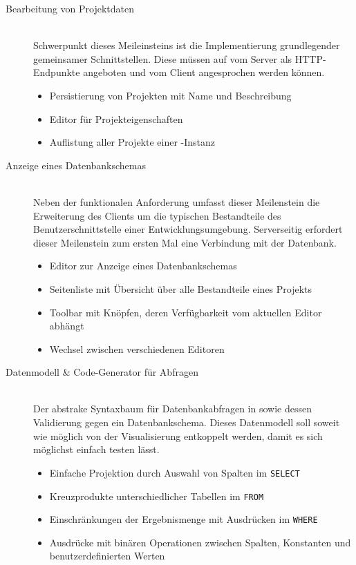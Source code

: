 \begin{description}
\item[Bearbeitung von Projektdaten] \hfill \\
  Schwerpunkt dieses Meileinsteins ist die Implementierung grundlegender gemeinsamer Schnittstellen. Diese müssen auf vom Server als HTTP-Endpunkte angeboten und vom Client angesprochen werden können.
  \begin{itemize}[noitemsep]
  \item Persistierung von Projekten mit Name und Beschreibung
  \item Editor für Projekteigenschaften
  \item Auflistung aller Projekte einer \idename-Instanz
  \end{itemize}
\item [Anzeige eines Datenbankschemas] \hfill \\
  Neben der funktionalen Anforderung umfasst dieser Meilenstein die Erweiterung des Clients um die typischen Bestandteile des Benutzerschnittstelle einer Entwicklungsumgebung. Serverseitig erfordert dieser Meilenstein zum ersten Mal eine Verbindung mit der Datenbank.
  \begin{itemize}[noitemsep]
  \item Editor zur Anzeige eines Datenbankschemas
  \item Seitenliste mit Übersicht über alle Bestandteile eines Projekts
  \item Toolbar mit Knöpfen, deren Verfügbarkeit vom aktuellen Editor abhängt
  \item Wechsel zwischen verschiedenen Editoren
  \end{itemize}
\item [Datenmodell \& Code-Generator für Abfragen] \hfill \\
  Der abstrake Syntaxbaum für Datenbankabfragen in \idename{} sowie dessen Validierung gegen ein Datenbankschema. Dieses Datenmodell soll soweit wie möglich von der Visualisierung entkoppelt werden, damit es sich möglichst einfach testen lässt.
  \begin{itemize}[noitemsep]
  \item Einfache Projektion durch Auswahl von Spalten im \texttt{SELECT}
  \item Kreuzprodukte unterschiedlicher Tabellen im \texttt{FROM}
  \item Einschränkungen der Ergebnismenge mit Ausdrücken im \texttt{WHERE}
  \item Ausdrücke mit binären Operationen zwischen Spalten, Konstanten und benutzerdefinierten Werten

\end{itemize}
\end{description}
